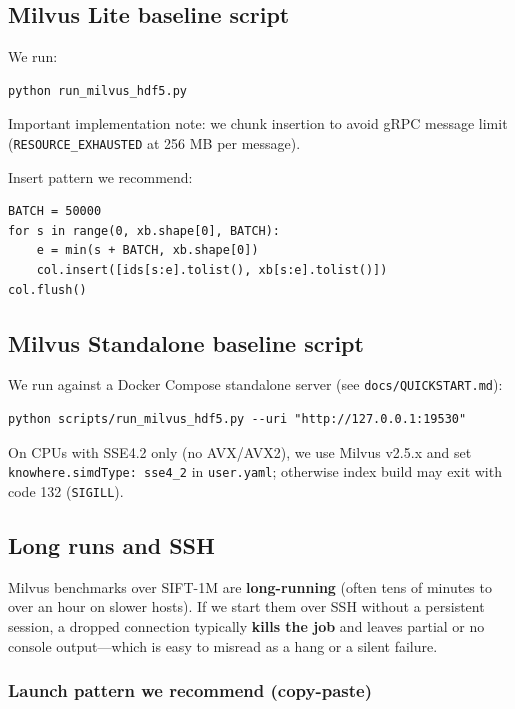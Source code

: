 \documentclass[11pt,a4paper]{article}
\begin{document}
\subsection{Milvus Lite baseline script}
\label{sec:milvus-script}

We run:
\begin{verbatim}
python run_milvus_hdf5.py
\end{verbatim}

Important implementation note: we chunk insertion to avoid gRPC message limit
(\texttt{RESOURCE\_EXHAUSTED} at 256 MB per message).

Insert pattern we recommend:
\begin{verbatim}
BATCH = 50000
for s in range(0, xb.shape[0], BATCH):
    e = min(s + BATCH, xb.shape[0])
    col.insert([ids[s:e].tolist(), xb[s:e].tolist()])
col.flush()
\end{verbatim}

\subsection{Milvus Standalone baseline script}
\label{sec:milvus-standalone-script}

We run against a Docker Compose standalone server (see \texttt{docs/QUICKSTART.md}):
\begin{verbatim}
python scripts/run_milvus_hdf5.py --uri "http://127.0.0.1:19530"
\end{verbatim}

On CPUs with SSE4.2 only (no AVX/AVX2), we use Milvus v2.5.x and set
\texttt{knowhere.simdType: sse4\_2} in \texttt{user.yaml}; otherwise index build may
exit with code 132 (\texttt{SIGILL}).

\subsection{Long runs and SSH}
\label{sec:long-runs-ssh}

Milvus benchmarks over SIFT-1M are \textbf{long-running} (often tens of minutes to
over an hour on slower hosts). If we start them over SSH without a persistent session,
a dropped connection typically \textbf{kills the job} and leaves partial or no console
output---which is easy to misread as a hang or a silent failure.

\subsubsection*{Launch pattern we recommend (copy-paste)}
\end{document}
